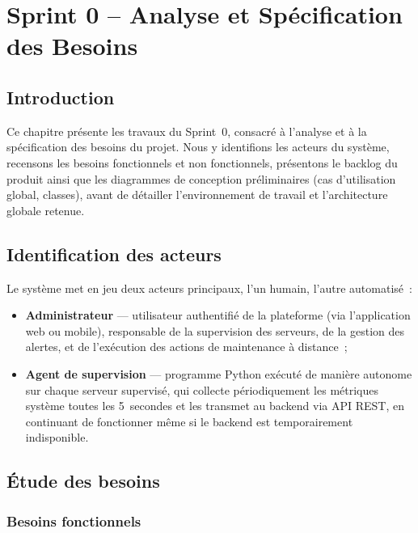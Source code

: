 \chapter{Sprint 0 -- Analyse et Spécification des Besoins}
\label{chap-sprint0}

\section*{Introduction}

Ce chapitre présente les travaux du Sprint~0, consacré à l'analyse et à la spécification des besoins du projet. Nous y identifions les acteurs du système, recensons les besoins fonctionnels et non fonctionnels, présentons le backlog du produit ainsi que les diagrammes de conception préliminaires (cas d'utilisation global, classes), avant de détailler l'environnement de travail et l'architecture globale retenue.

\section{Identification des acteurs}

Le système met en jeu deux acteurs principaux, l'un humain, l'autre automatisé~:

\begin{itemize}
  \item \textbf{Administrateur} — utilisateur authentifié de la plateforme (via l'application web ou mobile), responsable de la supervision des serveurs, de la gestion des alertes, et de l'exécution des actions de maintenance à distance~;
  \item \textbf{Agent de supervision} — programme Python exécuté de manière autonome sur chaque serveur supervisé, qui collecte périodiquement les métriques système toutes les 5~secondes et les transmet au backend via API REST, en continuant de fonctionner même si le backend est temporairement indisponible.
\end{itemize}

\section{Étude des besoins}

\subsection{Besoins fonctionnels}

